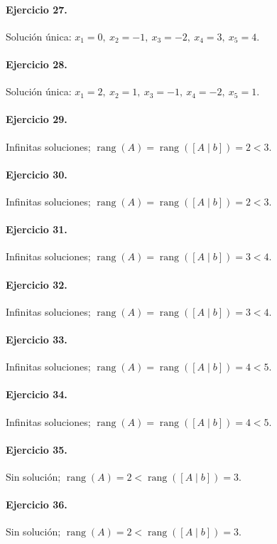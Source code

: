 \documentclass[12pt]{article}
\theoremstyle{remark}
\begin{document}
\paragraph{Ejercicio 27.} Solución única: \(x_{1}=0,\ x_{2}=-1,\ x_{3}=-2,\ x_{4}=3,\ x_{5}=4\).
\paragraph{Ejercicio 28.} Solución única: \(x_{1}=2,\ x_{2}=1,\ x_{3}=-1,\ x_{4}=-2,\ x_{5}=1\).
\paragraph{Ejercicio 29.} Infinitas soluciones; \(\operatorname{rang}(A)=\operatorname{rang}([A\mid b])=2<3\).
\paragraph{Ejercicio 30.} Infinitas soluciones; \(\operatorname{rang}(A)=\operatorname{rang}([A\mid b])=2<3\).
\paragraph{Ejercicio 31.} Infinitas soluciones; \(\operatorname{rang}(A)=\operatorname{rang}([A\mid b])=3<4\).
\paragraph{Ejercicio 32.} Infinitas soluciones; \(\operatorname{rang}(A)=\operatorname{rang}([A\mid b])=3<4\).
\paragraph{Ejercicio 33.} Infinitas soluciones; \(\operatorname{rang}(A)=\operatorname{rang}([A\mid b])=4<5\).
\paragraph{Ejercicio 34.} Infinitas soluciones; \(\operatorname{rang}(A)=\operatorname{rang}([A\mid b])=4<5\).
\paragraph{Ejercicio 35.} Sin solución; \(\operatorname{rang}(A)=2<\operatorname{rang}([A\mid b])=3\).
\paragraph{Ejercicio 36.} Sin solución; \(\operatorname{rang}(A)=2<\operatorname{rang}([A\mid b])=3\).
\end{document}
